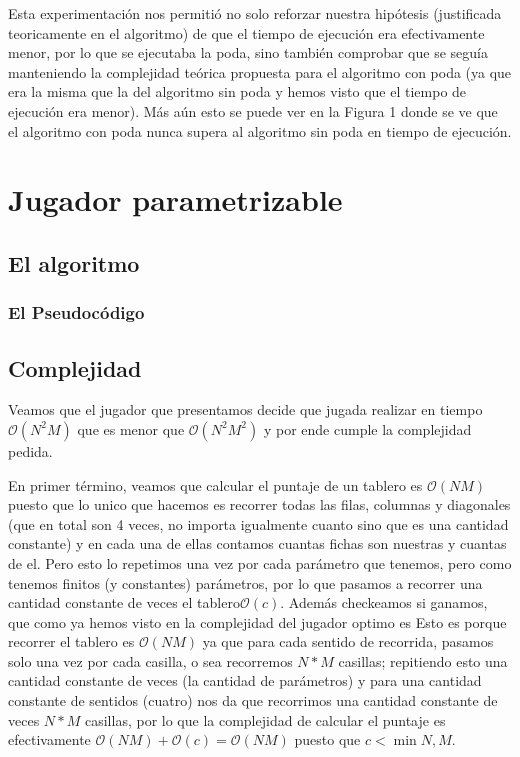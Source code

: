 \documentclass[A4paper,oneside,fleqn,11pt]{article}
\theoremstyle{definition}
\begin{document}
Esta experimentación nos permitió no solo reforzar nuestra hipótesis (justificada teoricamente en el algoritmo) de que el tiempo de ejecución era efectivamente menor, por lo que se ejecutaba la poda, sino también comprobar que se seguía manteniendo la complejidad teórica propuesta para el algoritmo con poda (ya que era la misma que la del algoritmo sin poda y hemos visto que el tiempo de ejecución era menor). Más aún esto se puede ver en la Figura 1 donde se ve que el algoritmo con poda nunca supera al algoritmo sin poda en tiempo de ejecución.



















\section{Jugador parametrizable}


\subsection{El algoritmo}

\subsubsection{El Pseudocódigo}



\subsection{Complejidad}

Veamos que el jugador que presentamos decide que jugada realizar en tiempo$\mathcal{O}(N^2 M)$ que es menor que $\mathcal{O}(N^2 M^2)$ y por ende cumple la complejidad pedida. 

En primer término, veamos que calcular el puntaje de un tablero es $\mathcal{O}(NM)$ puesto que lo unico que hacemos es recorrer todas las filas, columnas y diagonales (que en total son 4 veces, no importa igualmente cuanto sino que es una cantidad constante) y en cada una de ellas contamos cuantas fichas son nuestras y cuantas de el. Pero esto lo repetimos una vez por cada parámetro que tenemos, pero como tenemos finitos (y constantes) parámetros, por lo que pasamos a recorrer una cantidad constante de veces el tablero$\mathcal{O}(c)$. Además checkeamos si ganamos, que como ya hemos visto en la complejidad del jugador optimo es Esto es porque recorrer el tablero es $\mathcal{O}(NM)$ ya que para cada sentido de recorrida, pasamos solo una vez por cada casilla, o sea recorremos $N*M$ casillas; repitiendo esto una cantidad constante de veces (la cantidad de parámetros) y para una cantidad constante de sentidos (cuatro) nos da que recorrimos una cantidad constante de veces $N*M $ casillas, por lo que la complejidad de calcular el puntaje es efectivamente $\mathcal{O}(NM)+\mathcal{O}(c)=\mathcal{O}(NM)$ puesto que $c<\min{N,M}$.
\end{document}
